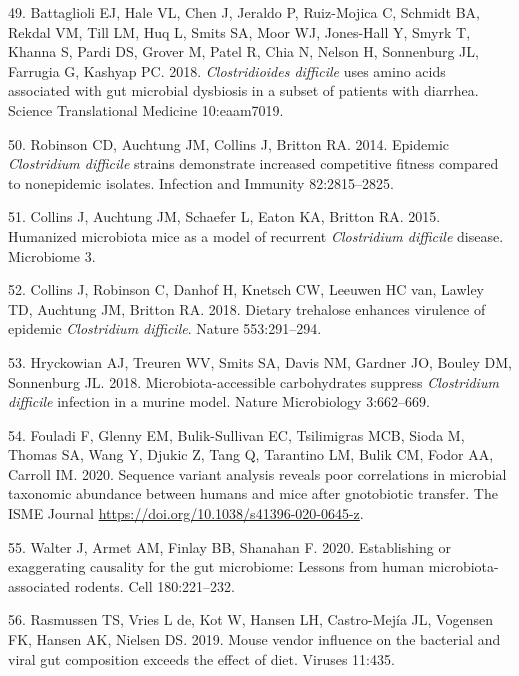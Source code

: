 \documentclass[
  11pt,
]{article}
\begin{document}
\leavevmode\hypertarget{ref-Battaglioli2018}{}%
49. Battaglioli EJ, Hale VL, Chen J, Jeraldo P, Ruiz-Mojica C, Schmidt
BA, Rekdal VM, Till LM, Huq L, Smits SA, Moor WJ, Jones-Hall Y, Smyrk T,
Khanna S, Pardi DS, Grover M, Patel R, Chia N, Nelson H, Sonnenburg JL,
Farrugia G, Kashyap PC. 2018. \emph{Clostridioides difficile} uses amino
acids associated with gut microbial dysbiosis in a subset of patients
with diarrhea. Science Translational Medicine 10:eaam7019.

\leavevmode\hypertarget{ref-Robinson2014}{}%
50. Robinson CD, Auchtung JM, Collins J, Britton RA. 2014. Epidemic
\emph{Clostridium difficile} strains demonstrate increased competitive
fitness compared to nonepidemic isolates. Infection and Immunity
82:2815--2825.

\leavevmode\hypertarget{ref-Collins2015}{}%
51. Collins J, Auchtung JM, Schaefer L, Eaton KA, Britton RA. 2015.
Humanized microbiota mice as a model of recurrent \emph{Clostridium
difficile} disease. Microbiome 3.

\leavevmode\hypertarget{ref-Collins2018}{}%
52. Collins J, Robinson C, Danhof H, Knetsch CW, Leeuwen HC van, Lawley
TD, Auchtung JM, Britton RA. 2018. Dietary trehalose enhances virulence
of epidemic \emph{Clostridium difficile}. Nature 553:291--294.

\leavevmode\hypertarget{ref-Hryckowian2018}{}%
53. Hryckowian AJ, Treuren WV, Smits SA, Davis NM, Gardner JO, Bouley
DM, Sonnenburg JL. 2018. Microbiota-accessible carbohydrates suppress
\emph{Clostridium difficile} infection in a murine model. Nature
Microbiology 3:662--669.

\leavevmode\hypertarget{ref-Fouladi2020}{}%
54. Fouladi F, Glenny EM, Bulik-Sullivan EC, Tsilimigras MCB, Sioda M,
Thomas SA, Wang Y, Djukic Z, Tang Q, Tarantino LM, Bulik CM, Fodor AA,
Carroll IM. 2020. Sequence variant analysis reveals poor correlations in
microbial taxonomic abundance between humans and mice after gnotobiotic
transfer. The ISME Journal
\url{https://doi.org/10.1038/s41396-020-0645-z}.

\leavevmode\hypertarget{ref-Walter2020}{}%
55. Walter J, Armet AM, Finlay BB, Shanahan F. 2020. Establishing or
exaggerating causality for the gut microbiome: Lessons from human
microbiota-associated rodents. Cell 180:221--232.

\leavevmode\hypertarget{ref-Rasmussen2019}{}%
56. Rasmussen TS, Vries L de, Kot W, Hansen LH, Castro-Mejía JL,
Vogensen FK, Hansen AK, Nielsen DS. 2019. Mouse vendor influence on the
bacterial and viral gut composition exceeds the effect of diet. Viruses
11:435.
\end{document}
